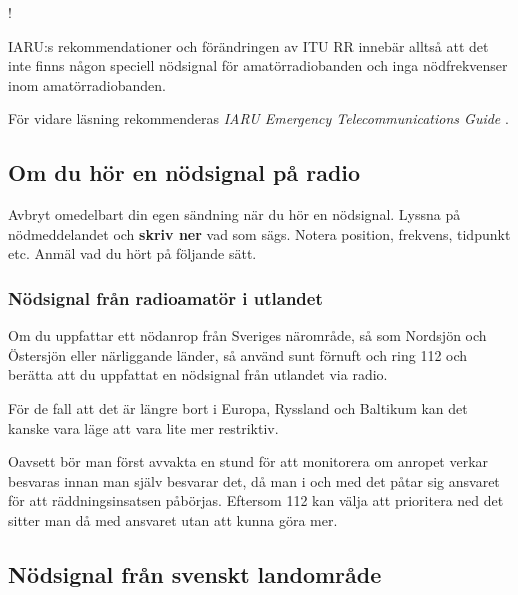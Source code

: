 \begin{center}
\begin{minipage}{0.19\columnwidth}
\Huge{\Huge{\hspace{1ex}!}}
\end{minipage}
\begin{minipage}{0.7\columnwidth}
IARU:s rekommendationer och förändringen av ITU RR innebär alltså att
det inte finns någon speciell nödsignal för amatörradiobanden och inga
nödfrekvenser inom amatörradiobanden.
\end{minipage}
\end{center}


För vidare läsning rekommenderas
\emph{IARU Emergency Telecommunications Guide} \cite{IARU-ETG}.

\subsection{Om du hör en nödsignal på radio}

Avbryt omedelbart din egen sändning när du hör en nödsignal. Lyssna på
nödmeddelandet och \textbf{skriv ner} vad som sägs.
Notera position, frekvens, tidpunkt etc. Anmäl vad du hört på följande sätt.

\subsubsection{Nödsignal från radioamatör i utlandet}

Om du uppfattar ett nödanrop från Sveriges närområde, så som Nordsjön och
Östersjön eller närliggande länder, så använd sunt förnuft och ring 112 och
berätta att du uppfattat en nödsignal från utlandet via radio.

För de fall att det är längre bort i Europa, Ryssland och Baltikum kan det
kanske vara läge att vara lite mer restriktiv.

Oavsett bör man först avvakta en stund för att monitorera om anropet verkar
besvaras innan man själv besvarar det, då man i och med det påtar sig ansvaret
för att räddningsinsatsen påbörjas.
Eftersom 112 kan välja att prioritera ned det sitter man då med ansvaret utan
att kunna göra mer.

\subsection{Nödsignal från svenskt landområde}

